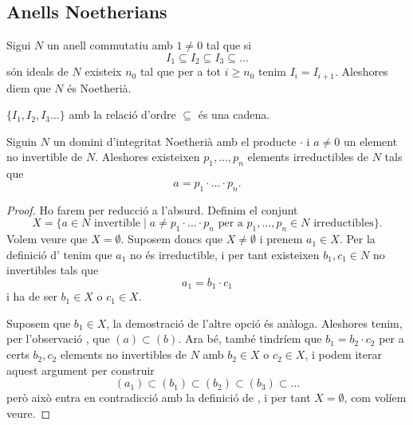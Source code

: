 \documentclass[../Apunts.tex]{subfiles}
\begin{document}
	\subsection{Anells Noetherians}
	\begin{definition}
		\label{def:anell Noetherià}
		Sigui \(N\) un anell commutatiu amb \(1\neq0\) tal que si
		\[I_{1}\subseteq I_{2}\subseteq I_{3}\subseteq\dots\]
		són ideals de \(N\) existeix \(n_{0}\) tal que per a tot \(i\geq n_{0}\) tenim \(I_{i}=I_{i+1}\). Aleshores diem que \(N\) és Noetherià.
	\end{definition}
	\begin{observation}
		\(\{I_{1},I_{2},I_{3}\dots\}\) amb la relació d'ordre \(\subseteq\) és una cadena.
	\end{observation}
	\begin{lemma}
		\label{lema:DIP és DFU}
		Siguin \(N\) un domini d'integritat Noetherià amb el producte \(\cdot\) i \(a\neq0\) un element no invertible de \(N\). Aleshores existeixen \(p_{1},\dots,p_{n}\) elements irreductibles de \(N\) tals que
		\[a=p_{1}\cdot\ldots\cdot p_{n}.\]
		\begin{proof}
			Ho farem per reducció a l'absurd. Definim el conjunt
			\[X=\{a\in N\text{ invertible}\mid a\neq p_{1}\cdot\ldots\cdot p_{n}\text{ per a }p_{1},\dots,p_{n}\in N\text{ irreductibles}\}.\]
			Volem veure que \(X=\emptyset\). Suposem doncs que \(X\neq\emptyset\) i prenem \(a_{1}\in X\). Per la definició d' tenim que \(a_{1}\) no és irreductible, i per tant existeixen \(b_{1},c_{1}\in N\) no invertibles tals que
			\[a_{1}=b_{1}\cdot c_{1}\]
			i ha de ser \(b_{1}\in X\) o \(c_{1}\in X\).
			
			Suposem que \(b_{1}\in X\), la demostració de l'altre opció és anàloga. Aleshores tenim, per l'observació , que \((a)\subset(b)\). Ara bé, també tindríem que \(b_{1}=b_{2}\cdot c_{2}\) per a certs \(b_{2},c_{2}\) elements no invertibles de \(N\) amb \(b_{2}\in X\) o \(c_{2}\in X\), i podem iterar aquest argument per construir
			\[(a_{1})\subset(b_{1})\subset(b_{2})\subset(b_{3})\subset\dots\]
			però això entra en contradicció amb la definició de , i per tant \(X=\emptyset\), com volíem veure.
		\end{proof}
	\end{lemma}
\end{document}
